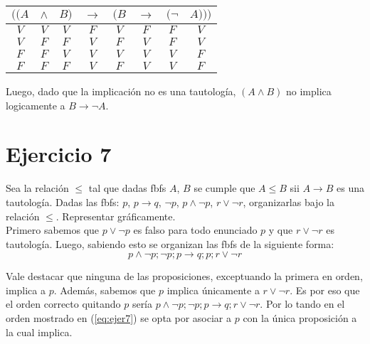 \documentclass[osajnl,twocolumn,showpacs,superscriptaddress,10pt]{revtex4-1} %
\begin{document}
\begin{enumerate}[i-]
  \begin{table}[h!]
    \setlength{\tabcolsep}{1.0em}
    \centering
    \begin{tabular}{ccc|c|cccc}
      $((A$ & $\wedge$ & $B)$ & $\rightarrow$ & $(B$ & $\rightarrow$ & $(\neg$ & $A)))$ \\
      \hline
      $V$ & $V$ & $V$ & $F$ & $V$ & $F$ & $F$ & $V$ \\
      $V$ & $F$ & $F$ & $V$ & $F$ & $V$ & $F$ & $V$ \\
      $F$ & $F$ & $V$ & $V$ & $V$ & $V$ & $V$ & $F$ \\
      $F$ & $F$ & $F$ & $V$ & $F$ & $V$ & $V$ & $F$
    \end{tabular}
  \end{table}

  Luego, dado que la implicación no es una tautología, $(A \wedge B)$ no implica logicamente a $B \rightarrow \neg A$. \\
\end{enumerate}

\section{Ejercicio 7}

Sea la relación $\leq$ tal que dadas fbfs $A$, $B$ se cumple que $A \leq B$ sii $A \rightarrow B$ es una tautología. Dadas las fbfs: $p$, $p \rightarrow q$, $\neg p$, $p \wedge \neg p$, $r \vee \neg r$, organizarlas bajo la relación $\leq$. Representar gráficamente. \\

Primero sabemos que $p \vee \neg p$ es falso para todo enunciado $p$ y que $r \vee \neg r$ es tautología. Luego, sabiendo esto se organizan las fbfs de la siguiente forma: \\

\begin{equation}
  p \wedge \neg p; \neg p; p \rightarrow q; p; r \vee \neg r
  \label{eq:ejer7}
\end{equation}

Vale destacar que ninguna de las proposiciones, exceptuando la primera en orden, implica a $p$. Además, sabemos que $p$ implica únicamente a $r \vee \neg r$. Es por eso que el orden correcto quitando $p$ sería $p \wedge \neg p; \neg p; p \rightarrow q; r \vee \neg r$. Por lo tando en el orden mostrado en (\ref{eq:ejer7}) se opta por asociar a $p$ con la única proposición a la cual implica. \\
\end{document}
